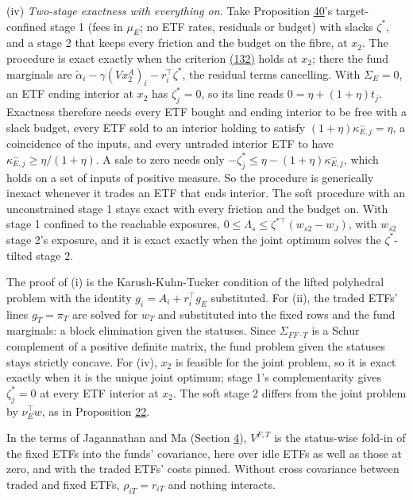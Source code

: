 \documentclass[11pt]{article}
\begin{document}
(iv) \emph{Two-stage exactness with everything on.} Take Proposition \hyperref[res:Proposition-40]{40}'s
target-confined stage 1 (fees in \(\mu_E\); no ETF rates, residuals or
budget) with slacks \(\zeta^*\), and a stage 2 that keeps every friction and
the budget on the fibre, at \(x_2\). The procedure is exact exactly when
the criterion \hyperref[eq:132]{(132)} holds at \(x_2\); there the fund marginals are
\(\tilde\alpha_i-\gamma(Vx^A_2)_i-r_i^\top\zeta^*\), the residual terms cancelling. With \(\Sigma_E=0\), an
ETF ending interior at \(x_2\) has \(\zeta^*_j=0\), so its line reads
\(0=\eta+(1+\eta)t_j\). Exactness therefore needs every ETF bought and ending
interior to be free with a slack budget, every ETF sold to an interior
holding to satisfy \((1+\eta)\kappa^-_{E,j}=\eta\), a coincidence of the inputs, and
every untraded interior ETF to have \(\kappa^-_{E,j}\geq\eta/(1+\eta)\). A sale to zero
needs only \(-\zeta^*_j\leq\eta-(1+\eta)\kappa^-_{E,j}\), which holds on a set of inputs of
positive measure. So the procedure is generically inexact whenever
it trades an ETF that ends interior. The soft procedure with an
unconstrained stage 1 stays exact with every friction and the budget
on. With stage 1 confined to the reachable exposures,
\(0\leq\Lambda_s\leq\zeta^{*\top}(w_{s2}-w_J)\), with \(w_{s2}\) stage 2's exposure, and it is exact
exactly when the joint optimum solves the \(\zeta^*\)-tilted stage 2.

The proof of (i) is the Karush-Kuhn-Tucker condition of the lifted
polyhedral problem with the identity \(g_i=A_i+r_i^\top g_E\) substituted. For
(ii), the traded ETFs' lines \(g_T=\pi_T\) are solved for \(w_T\) and substituted
into the fixed rows and the fund marginals: a block elimination given
the statuses. Since \(\Sigma_{FF\cdot T}\) is a Schur complement of a positive
definite matrix, the fund problem given the statuses stays strictly
concave. For (iv), \(x_2\) is feasible for the joint problem, so it is
exact exactly when it is the unique joint optimum; stage 1's
complementarity gives \(\zeta^*_j=0\) at every ETF interior at \(x_2\). The soft
stage 2 differs from the joint problem by \(\nu_E^\top w\), as in Proposition \hyperref[res:Proposition-22]{22}.

In the terms of Jagannathan and Ma (Section \hyperref[sec:4]{4}), \(V^{F,T}\) is the
status-wise fold-in of the fixed ETFs into the funds' covariance, here
over idle ETFs as well as those at zero, and with the traded ETFs'
costs pinned. Without cross covariance between traded and fixed ETFs,
\(\rho_{iT}=r_{iT}\) and nothing interacts.
\end{document}
